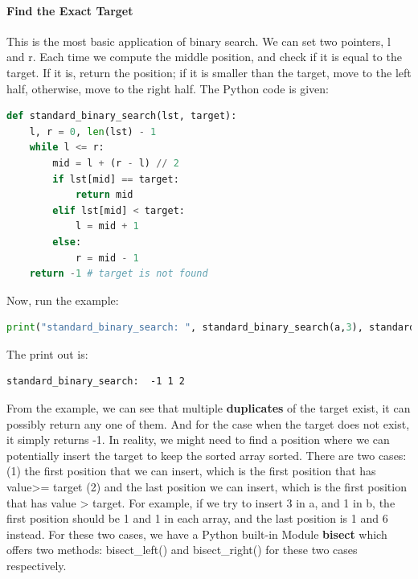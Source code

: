 \documentclass[../searching.tex]{subfiles}
\begin{document}
\paragraph{Find the Exact Target} This is the most basic application of binary search. We can set two pointers, l and r. Each time we compute the middle position, and check if it is equal to the target. If it is, return the position; if it is smaller than the target, move to the left half, otherwise, move to the right half. The Python code is given:
\begin{lstlisting}[language=Python]
def standard_binary_search(lst, target):
    l, r = 0, len(lst) - 1
    while l <= r:
        mid = l + (r - l) // 2
        if lst[mid] == target:
            return mid
        elif lst[mid] < target:
            l = mid + 1
        else:
            r = mid - 1
    return -1 # target is not found 
\end{lstlisting}
Now, run the example:
\begin{lstlisting}[language=Python]
print("standard_binary_search: ", standard_binary_search(a,3), standard_binary_search(a,4), standard_binary_search(b, 1))
\end{lstlisting}
The print out is:
\begin{lstlisting}
standard_binary_search:  -1 1 2
\end{lstlisting}
From the example, we can see that multiple \textbf{duplicates} of the target exist, it can possibly return any one of them. And for the case when the target does not exist, it simply returns -1. In reality, we might need to find a position where we can potentially insert the target to keep the sorted array sorted. There are two cases: (1) the first position that we can insert, which is the first position that has value>= target (2) and the last position we can insert, which is the first position that has value > target. For example, if we try to insert 3 in a, and 1 in b, the first position should be 1 and 1 in each array, and the last position is 1 and 6 instead.  For these two cases, we have a Python built-in Module \textbf{bisect} which offers two methods: bisect\_left() and bisect\_right() for these two cases respectively.
\end{document}
